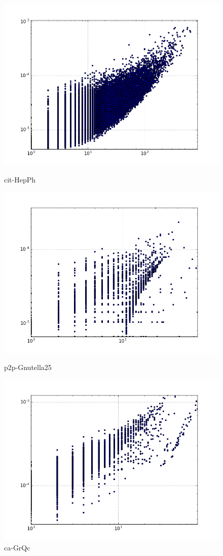 \begin{figure}[H]
  \includegraphics[width=\linewidth]{img/cit-HepPh/degreeVSpagerank.png}
  \caption*{cit-HepPh}
\endminipage\hfill
{}
  \includegraphics[width=\linewidth]{img/p2p-Gnutella25/degreeVSpagerank.png}
  \caption*{p2p-Gnutella25}
\endminipage\hfill
{}
  \includegraphics[width=\linewidth]{img/ca-GrQc/degreeVSpagerank.png}
  \caption*{ca-GrQc}
\endminipage
\end{figure}
